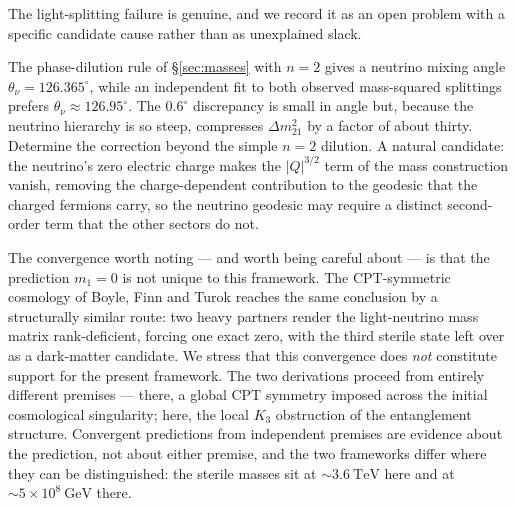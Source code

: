 The light-splitting failure is genuine, and we record it as an open problem with a specific candidate
cause rather than as unexplained slack.

\begin{openproblem}\label{op:neutrino-splitting}
The phase-dilution rule of \S\ref{sec:masses} with $n = 2$ gives a neutrino mixing angle
$\theta_\nu = 126.365^\circ$, while an independent fit to both observed mass-squared splittings
prefers $\theta_\nu \approx 126.95^\circ$. The $0.6^\circ$ discrepancy is small in angle but, because
the neutrino hierarchy is so steep, compresses $\Delta m^2_{21}$ by a factor of about thirty.
Determine the correction beyond the simple $n = 2$ dilution. A natural candidate: the neutrino's zero
electric charge makes the $\lvert Q\rvert^{3/2}$ term of the mass construction vanish, removing the
charge-dependent contribution to the geodesic that the charged fermions carry, so the neutrino
geodesic may require a distinct second-order term that the other sectors do not.
\end{openproblem}

The convergence worth noting --- and worth being careful about --- is that the prediction
$m_1 = 0$ is not unique to this framework. The CPT-symmetric cosmology of Boyle, Finn and Turok
\autocite{boylefinnturok2018cpt,boylefinnturok2022bigbang} reaches the same conclusion by a
structurally similar route: two heavy partners render the light-neutrino mass matrix rank-deficient,
forcing one exact zero, with the third sterile state left over as a dark-matter candidate. We stress
that this convergence does \emph{not} constitute support for the present framework. The two
derivations proceed from entirely different premises --- there, a global CPT symmetry imposed across
the initial cosmological singularity; here, the local $K_3$ obstruction of the entanglement
structure. Convergent predictions from independent premises are evidence about the prediction, not
about either premise, and the two frameworks differ where they can be distinguished: the sterile
masses sit at $\sim 3.6\ \mathrm{TeV}$ here and at $\sim 5\times10^{8}\ \mathrm{GeV}$ there.

